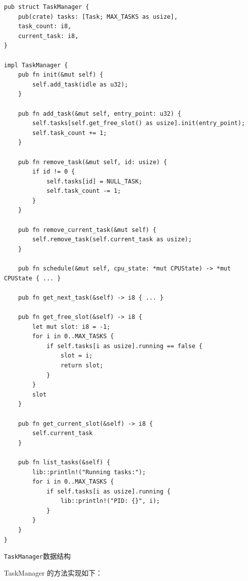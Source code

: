 \begin{listing}[htbp]
    \begin{verbatim}
pub struct TaskManager {
    pub(crate) tasks: [Task; MAX_TASKS as usize],
    task_count: i8,
    current_task: i8,
}

impl TaskManager {
    pub fn init(&mut self) {
        self.add_task(idle as u32);
    }

    pub fn add_task(&mut self, entry_point: u32) {
        self.tasks[self.get_free_slot() as usize].init(entry_point);
        self.task_count += 1;
    }

    pub fn remove_task(&mut self, id: usize) {
        if id != 0 {
            self.tasks[id] = NULL_TASK;
            self.task_count -= 1;
        }
    }

    pub fn remove_current_task(&mut self) {
        self.remove_task(self.current_task as usize);
    }

    pub fn schedule(&mut self, cpu_state: *mut CPUState) -> *mut CPUState { ... }

    pub fn get_next_task(&self) -> i8 { ... }

    pub fn get_free_slot(&self) -> i8 {
        let mut slot: i8 = -1;
        for i in 0..MAX_TASKS {
            if self.tasks[i as usize].running == false {
                slot = i;
                return slot;
            }
        }
        slot
    }

    pub fn get_current_slot(&self) -> i8 {
        self.current_task
    }

    pub fn list_tasks(&self) {
        lib::println!("Running tasks:");
        for i in 0..MAX_TASKS {
            if self.tasks[i as usize].running {
                lib::println!("PID: {}", i);
            }
        }
    }
}
    \end{verbatim}
    \caption{\texttt{TaskManager}数据结构}\label{lst:TaskManagerDataStructure}
\end{listing}

TaskManager 的方法实现如下：

